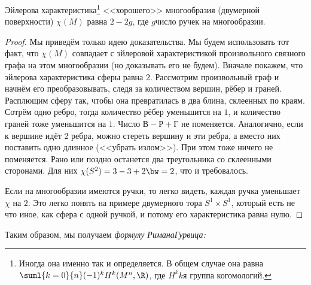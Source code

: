 \documentclass[a4paper]{article}
\begin{document}
\begin{stm}
Эйлерова характеристика\footnote{Иногда она именно так и определяется. В общем случае она равна $\suml{k=0}{n} (-1)^k H^k(M^n,\R)$,
где $H^k$\т $k$\д я группа когомологий.} <<хорошего>> многообразия (двумерной поверхности)
$\chi(M)$ равна $2-2g$, где $g$\т число ручек на многообразии.
\end{stm}
\begin{proof}
Мы приведём только идею доказательства. Мы будем использовать тот факт, что $\chi(M)$ совпадает с эйлеровой
характеристикой произвольного связного графа на этом многообразии (но доказывать его не будем).
Вначале покажем, что эйлерова характеристика сферы равна $2$. Рассмотрим произвольный граф и начнём его преобразовывать,
следя за количеством вершин, рёбер и граней. Расплющим сферу так, чтобы она превратилась в два блина, склеенных по краям.
Сотрём одно ребро, тогда количество рёбер уменьшится на $1$, и количество граней тоже уменьшится на $1$. Число $В - Р+Г$
не поменяется. Аналогично, если к вершине идёт 2 ребра, можно стереть вершину и эти ребра, а вместо них поставить
одно длинное (<<убрать излом>>). При этом тоже ничего не поменяется. Рано или поздно останется два треугольника со склеенными
сторонами. Для них $\chi(S^2) = 3 - 3 + 2\bw=2$, что и требовалось.

Если на многообразии имеются ручки, то легко видеть, каждая ручка уменьшает $\chi$ на $2$. Это легко понять на примере
двумерного тора $S^1 \times S^1$, который есть не что иное, как сфера с одной ручкой, и потому его характеристика равна нулю.
\end{proof}

Таким образом, мы получаем \emph{формулу Римана\ч Гурвица:}
\end{document}
